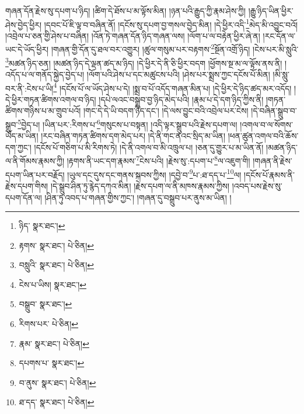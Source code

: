 གཞན་དོན་རྗེས་སུ་དཔག་པ་ཉིད། །ཚིག་དེ་ཐོས་པ་མ་ལྟོས་མིན། །ཉན་པའི་རྒྱུད་ཀྱི་རྣམ་ཤེས་ཀྱི། །རྒྱུ་ཉིད་ཡིན་ཕྱིར་ཤེས་བྱེད་ཕྱིར། །དབང་པོ་ཇི་ལྟ་བ་བཞིན་ནོ། །དངོས་སུ་དཔག་བྱ་གསལ་བྱེད་མིན། །དེ་ཕྱིར་འདི་\footnote{ཉིད་  སྣར་ཐང་། }མེད་མི་འབྱུང་བའོ། །འབྲེལ་པ་ཅན་གྱི་ཤེས་པ་བཞིན། །འོན་ཏེ་གཞན་དོན་ཉིད་གཞན་ལས། །ལོག་པ་ལ་བརྟེན་ཕྱིར་ཞེ་ན། །རང་དོན་ལ་ཡང་དེ་ཡོད་ཕྱིར། །གཞན་གྱི་དོན་དུ་ཐལ་བར་འགྱུར། །ཚུལ་གསུམ་པར་བརྟགས་\footnote{རྟགས་  སྣར་ཐང་།  པེ་ཅིན། }སྔོན་འགྲོ་ཉིད། །ངེས་པར་མི་སླུའི་\footnote{བསླུའི་  སྣར་ཐང་།  པེ་ཅིན། }མཚན་ཉིད་ཅན། །མཚན་ཉིད་དེ་ལྡན་ཚད་མ་ཉིད། །དེ་ཕྱིར་དེ་ནི་ཅི་ཕྱིར་བདག །ཕྱོགས་སྔ་མ་ལ་ལྟོས་ནས་ནི། །འདོད་པ་ལ་གནོད་སྐྱེད་བྱེད་པ། །ལོག་པའི་ཤེས་པ་དང་མཚུངས་པའི། །ཤེས་པར་སྨྲས་ཀྱང་དངོས་པོ་མིན། །མི་སླུ་བར་ནི་:ངེས་པ་ཡི།\footnote{ངེས་པ་ཡིས།  སྣར་ཐང་། } །དངོས་པོ་ལ་ཡོད་ཤེས་པ་དེ། །སྨྲ་བ་པོ་འདོད་གཞན་མིན་པ། །དེ་ཕྱིར་དེ་ཉིད་ཚད་མར་འདོད། །དེ་ཕྱིར་གཏན་ཚིགས་འགལ་བ་ཉིད། །དཔེ་ལའང་བསྒྲུབ་བྱ་ཉིད་མེད་པའི། །རྣམ་པ་དེ་དག་ཉིད་ཀྱིས་ནི། །གཏན་ཚིགས་གཉིས་པ་མ་གྲུབ་པའོ། །གང་དེ་དེ་ཡི་བདག་ཉིད་དང་། །དེ་ལས་བྱུང་བའི་འབྲེལ་པར་ངེས། །དེ་བཞིན་སྒྲུབ་བ་སྒྲུབ་\footnote{བསྒྲུབ་  སྣར་ཐང་། }བྱེད་པ། །ཡིན་པར་:རིགས་པ་\footnote{རིགས་པར་  པེ་ཅིན། }གསུངས་པ་བསྟན། །འདི་ལྟར་སྒྲུབ་པའི་རྗེས་དཔག་ལ། །འགལ་བ་ལ་སོགས་ཡོད་མ་ཡིན། །རང་བཞིན་གཏན་ཚིགས་དག་མེད་པར། །དེ་ནི་གང་ནའང་སྲིད་མ་ཡིན། །ཕན་ཚུན་འགལ་བའི་ཆོས་དག་ཀྱང་། །དངོས་པོ་གཅིག་པ་མི་རིགས་ཏེ། །དེ་ནི་འགལ་བ་མི་འཁྲུལ་པ། །ཅན་དུ་གྱུར་པ་མ་ཡིན་ནོ། །མཚན་ཉིད་ལ་ནི་གོམས་རྣམས་ཀྱི། །རྟགས་ནི་ཡང་དག་རྣམས་\footnote{རྣམ་  སྣར་ཐང་།  པེ་ཅིན། }ངེས་པའི། །རྗེས་སུ་:དཔག་པ་\footnote{དཔགས་པ་  སྣར་ཐང་། }ལ་འཇུག་གི། །གཞན་ནི་རྗེས་དཔག་ཡིན་པར་བརྗོད། །ཡུལ་དང་དུས་དང་གནས་སྐབས་ཀྱིས། །དབྱེ་བ་\footnote{བ་ནུས་  སྣར་ཐང་།  པེ་ཅིན། }པ་:ཐ་དད་པ་\footnote{ཐ་དད་  སྣར་ཐང་།  པེ་ཅིན། }ལ། །དངོས་པོ་རྣམས་ནི་རྗེས་དཔག་གིས། །དེ་སྒྲུབ་ཤིན་ཏུ་རྙེད་དཀའ་མིན། །རྗེས་དཔག་ལ་ནི་མཁས་རྣམས་ཀྱིས། །འབད་པས་རྗེས་སུ་དཔག་དོན་ལ། །ཤིན་ཏུ་འབད་པ་གཞན་གྱིས་ཀྱང་། །གཞན་དུ་བསྒྲུབ་པར་ནུས་མ་ཡིན། །
